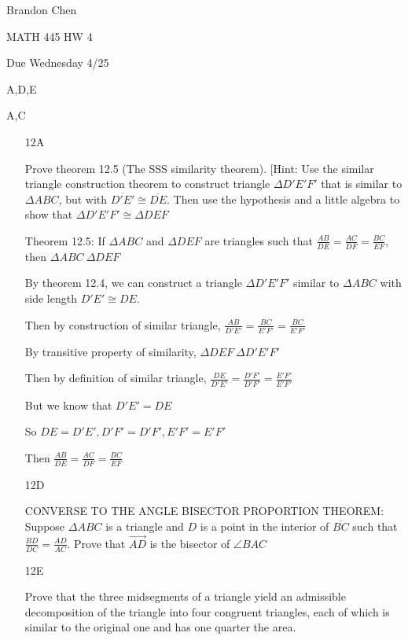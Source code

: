 \documentclass[11pt]{article}
\newcommand{\ray}[1]{\overrightarrow{#1}}
\newcommand{\segment}[1]{\overline{#1}}
\begin{document}
\noindent Brandon Chen

\noindent MATH 445 HW 4

\noindent Due Wednesday 4/25

 A,D,E

 A,C

\begin{itemize}

	\item[12A]

		Prove theorem 12.5 (The SSS similarity theorem). [Hint: Use the similar triangle construction theorem to construct triangle $\Delta D'E'F'$ that is similar to $\Delta ABC$, but with $\segment{D'E'} \cong \segment{DE}$. Then use the hypothesis and a little algebra to show that $\Delta D'E'F' \cong \Delta DEF$

	Theorem 12.5: If $\Delta ABC$ and $\Delta DEF$ are triangles such that $\frac{AB}{DE} = \frac{AC}{DF} = \frac{BC}{EF}$, then $\Delta ABC ~ \Delta DEF$

	By theorem 12.4, we can construct a triangle $\Delta D'E'F'$ similar to $\Delta ABC$ with side length $D'E' \cong DE$. 

	Then by construction of similar triangle, $\frac{AB}{D'E'} = \frac{BC}{E'F'} = \frac{BC}{E'F'}$

	By transitive property of similarity, $\Delta DEF ~ \Delta D'E'F'$

	Then by definition of similar triangle, $\frac{DE}{D'E'} = \frac{D'F'}{D'F'} = \frac{E'F'}{E'F'}$

	But we know that $D'E' = DE$

	So $DE = D'E', D'F' = D'F', E'F' = E'F'$

	Then $\frac{AB}{DE} = \frac{AC}{DF} = \frac{BC}{EF}$

	\item[12D]

		CONVERSE TO THE ANGLE BISECTOR PROPORTION THEOREM: Suppose $\Delta ABC$ is a triangle and $D$ is a point in the interior of $\segment{BC}$ such that $\frac{BD}{DC} = \frac{AD}{AC}$. Prove that $\ray{AD}$ is the bisector of $\angle BAC$



	\item[12E]

		Prove that the three midsegments of a triangle yield an admissible decomposition of the triangle into four congruent triangles, each of which is similar to the original one and has one quarter the area.


\end{itemize}
\end{document}
